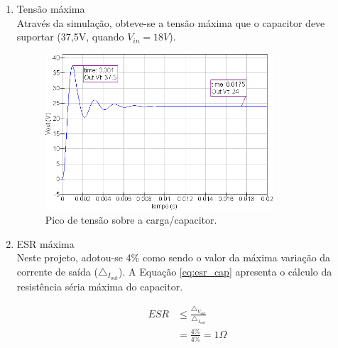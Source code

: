 \documentclass[a4paper]{article}
\begin{document}
{\begin{enumerate}
\begin{enumerate}
\begin{equation}
\label{eq:d_max_cap}
\begin{split}
D & = 1-\frac{V_{in}}{V_{out}} \\
& = 1-\frac{9}{24} = 62.5\%
\end{split}
\end{equation}

Para este projeto, adotou-se a variação de tensão igual a 4\%. A Equação \ref{eq:cap} apresenta o cálculo do valor mínimo da capacitância.

\begin{equation}
\label{eq:cap}
\begin{split}
C_{ap} & \geq \frac{D_{max} \cdot I_{out}}{{\triangle}_{V_{out}} \cdot f_{req}} \\
& = \frac{62,5\% \cdot 1,250}{4\% \cdot 250k} = 78,125\mu F
\end{split}
\end{equation}

\item Tensão máxima \\
Através da simulação, obteve-se a tensão máxima que o capacitor deve suportar (37,5V, quando $V_{in} = 18V$).
\FloatBarrier
\begin{figure}[H]
	\centering
	\includegraphics[width=0.8\textwidth]{vout_vinmax.png}
	\caption{Pico de tensão sobre a carga/capacitor.}
	\label{fig:vout_vinmax}
\end{figure}
\FloatBarrier
\item ESR máxima \\
Neste projeto, adotou-se 4\% como sendo o valor da máxima variação da corrente de saída (${\triangle}_{I_{out}}$). A Equação \ref{eq:esr_cap} apresenta o cálculo da resistência séria máxima do capacitor.

\begin{equation}
\label{eq:esr_cap}
\begin{split}
ESR & \leq \frac{{\triangle}_{V_{out}}}{{\triangle}_{I_{out}}} \\
& = \frac{4\%}{4\%} = 1 \Omega
\end{split}
\end{equation}


\end{enumerate}
\end{enumerate}}
\end{document}
